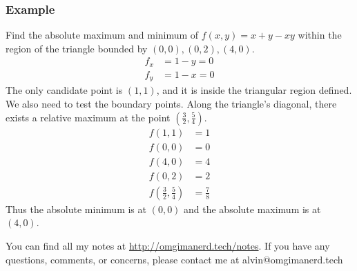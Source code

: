 \documentclass[letterpaper, 12pt]{math}
\begin{document}
\subsubsection*{Example}
Find the absolute maximum and minimum of \( f(x,y) = x+y-xy \) within the
region of the triangle bounded by \( (0,0),(0,2),(4,0) \).
\begin{align*}
  f_x &= 1-y = 0 \\
  f_y &= 1-x = 0
\end{align*}
The only candidate point is \( (1,1) \), and it is inside the triangular
region defined. We also need to test the boundary points. Along the triangle's
diagonal, there exists a relative maximum at the point \( (\frac{3}{2},
\frac{5}{4}) \).
\begin{align*}
  f(1,1) &= 1 \\
  f(0,0) &= 0 \\
  f(4,0) &= 4 \\
  f(0,2) &= 2 \\
  f(\frac{3}{2},\frac{5}{4}) &= \frac{7}{8}
\end{align*}
Thus the absolute minimum is at \( (0,0) \) and the absolute maximum is at
\( (4,0) \).

\begin{center}
  You can find all my notes at \url{http://omgimanerd.tech/notes}. If you have
  any questions, comments, or concerns, please contact me at
  alvin@omgimanerd.tech
\end{center}
\end{document}
